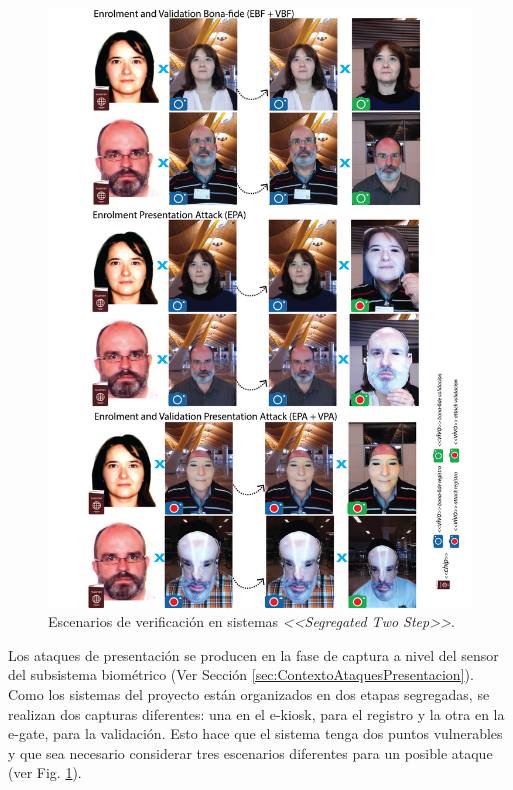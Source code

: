 \begin{figure}
    \centering
    \includegraphics[width=\textwidth]{ch-sistemasABC/images/ch-evaluacion_topologias/ESCENARIOS_VERIFICACION_DOS_PASOS_VER.png}
    \caption{Escenarios de verificación en sistemas  \textit{<<Segregated Two Step>>}.}
    \label{fig:escenariosVerifacionABC}
\end{figure}

Los ataques de presentación se producen en la fase de captura a nivel del sensor del subsistema biométrico (Ver Sección \ref{sec:ContextoAtaquesPresentacion}). Como los sistemas  del proyecto  están organizados en dos etapas segregadas, se realizan dos capturas diferentes: una en el \gls{e-kiosk}, para el registro y la otra en la \gls{e-gate}, para la validación. Esto hace que el sistema tenga dos puntos vulnerables y que sea necesario considerar tres escenarios diferentes para un posible ataque (ver Fig. \ref{fig:escenariosVerifacionABC}).

